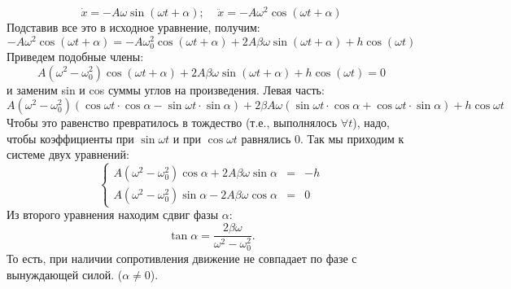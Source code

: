 \begin{displaymath}
\dot{x}=-A\omega\sin(\omega t +\alpha);\;\;\;\;\ddot{x}=-A\omega^2\cos(\omega t +\alpha)
\end{displaymath}
Подставив все это в исходное уравнение, получим:
\begin{displaymath}
-A\omega^2\cos(\omega t +\alpha)=-A\omega_0^2\cos(\omega t +\alpha)+2A\beta \omega\sin(\omega t +\alpha)+h\cos(\omega t)
\end{displaymath}
Приведем подобные члены:
\begin{displaymath}
A(\omega^2-\omega_0^2)\cos(\omega t +\alpha)+2A\beta\omega\sin(\omega t +\alpha)+h\cos(\omega t)=0
\end{displaymath}
 и заменим sin и cos суммы углов на произведения. Левая часть:
\begin{displaymath}
A(\omega^2\!\!-\omega_0^2)(\cos\omega t\cdot\cos\alpha-\sin\omega t\cdot\sin\alpha)+
2\beta A\omega(\sin\omega t\cdot\cos\alpha+\cos\omega t\cdot\sin\alpha)+h\cos\omega t
\end{displaymath}
Чтобы это равенство превратилось в тождество (т.е., выполнялось $\forall t$), надо, чтобы коэффициенты при $\sin \omega t$ и при $\cos\omega t$ равнялись 0. Так мы приходим
к системе двух уравнений:
\begin{displaymath}
\left\{
\begin{array}{ccl}
A(\omega^2\!\!-\omega_0^2)\cos\alpha+2A\beta\omega\sin\alpha&=&-h\\
A(\omega^2\!\!-\omega_0^2)\sin\alpha-2A\beta\omega\cos\alpha&=&0
\end{array}
\right.
\end{displaymath}
Из второго уравнения находим сдвиг фазы $\alpha$:
\begin{displaymath}
\tan\alpha=\frac{2\beta\omega}{\omega^2\!\!-\omega_0^2}.
\end{displaymath}
То есть, при наличии сопротивления движение не совпадает по фазе с вынуждающей силой.
 ($\alpha\neq0$).

